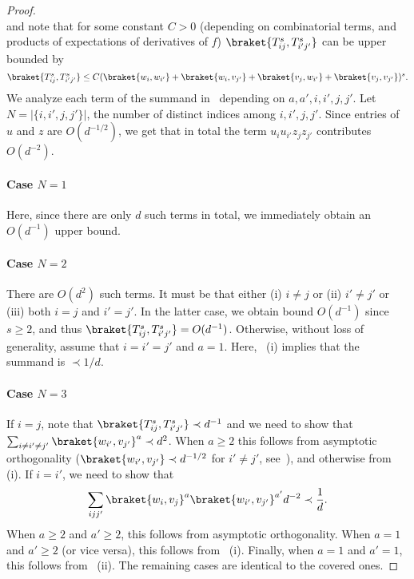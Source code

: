 \begin{proof}
\begin{equation}
\end{equation}
and note that for some constant \(C > 0\) (depending on combinatorial terms, and products of expectations of derivatives of \(f\))
\(\braket{T_{ij}^s, T_{i' j'}^s}\) can be upper bounded by
\begin{equation}
    \braket{T_{ij}^s, T_{i'j'}^s} \leq C(\braket{w_i, w_{i'}} + \braket{w_i, v_{j'}} + \braket{v_j, w_{i'}} + \braket{v_j, v_{j'}})^s.
\end{equation}
We analyze each term of the summand in~ depending on \(a, a', i, i', j, j'\).
Let \(N = \lvert\{i, i', j, j'\}\rvert\), the number of distinct indices among \(i, i', j, j'\).
Since entries of \(u\) and \(z\) are \(O(d^{-1/2})\), we get that in total the term \(u_i u_{i'} z_j z_{j'}\) contributes \(O(d^{-2})\).

\paragraph{Case \(N = 1\)}
Here, since there are only \(d\) such terms in total, we immediately obtain an \(O(d^{-1})\) upper bound.
\paragraph{Case \(N = 2\)}
There are \(O(d^2)\) such terms. It must be that either (i) \(i \neq j\) or (ii) \(i' \neq j'\) or (iii) both \(i = j\) and \(i' = j'\).
In the latter case, we obtain bound \(O(d^{-1})\) since \(s \geq 2\), and thus \(\braket{T_{ij}^s, T_{i'j'}^s} = O(d^{-1})\).
Otherwise, without loss of generality, assume that \(i = i' = j'\) and \(a = 1\). Here,~ (i) implies that the summand is \(\prec 1/d\).
\paragraph{Case \(N = 3\)}
If \(i = j\), note that \(\braket{T_{ij}^s, T_{i'j'}^s} \prec d^{-1}\) and we need to show that \(\sum_{i \neq i' \neq j'} \braket{w_{i'}, v_{j'}}^a \prec d^2\).
When \(a \geq 2\) this follows from asymptotic orthogonality (\(\braket{w_{i'}, v_{j'}} \prec d^{-1/2}\) for \(i' \neq j'\), see~), and otherwise from~ (i).
If \(i = i'\), we need to show that 
\begin{equation}
    \sum_{i j j'} \braket{w_i, v_j}^a \braket{w_{i'}, v_{j'}}^{a'} d^{-2} \prec \frac{1}{d}.
\end{equation}
When \(a \geq 2\) and \(a' \geq 2\), this follows from asymptotic orthogonality.
When \(a = 1\) and \(a' \geq 2\) (or vice versa), this follows from~ (i).
Finally, when \(a = 1\) and \(a' = 1\), this follows from~ (ii).
The remaining cases are identical to the covered ones.

\end{proof}
